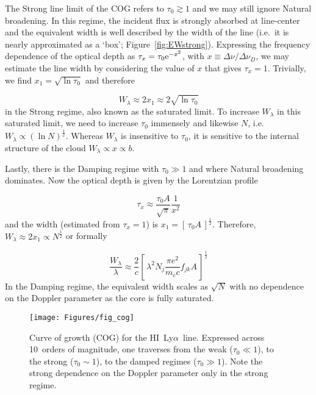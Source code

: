 \documentclass[graybox]{svmult}
\newcommand{\HI}{H{\sc I}}
\def\lya{Ly$\alpha$}
\def\ohf{\frac{1}{2}}
\def\ltk{\left [ \,}
\def\rtk{\, \right  ] }
\def\rme{{\rm e}}
\begin{document}
The Strong line limit of the COG refers to $\tau_0 \gtrsim 1$
and we may still ignore Natural broadening.
In this regime, the incident flux is strongly absorbed at line-center
and the equivalent width is well described by the width
of the line (i.e.\ it is nearly approximated as a `box';
Figure~\ref{fig:EWstrong}).
Expressing the frequency dependence of the optical
depth as $\tau_x = \tau_0 \rme^{-x^2}$, with
$x \equiv \Delta \nu / \Delta \nu_D$, we may estimate the 
line width by 
considering the value of $x$ that gives $\tau_x = 1$.
Trivially, we find $x_1 = \sqrt{\ln \tau_0}$ and therefore

\begin{equation}
W_\lambda \approx 2 x_1 \approx 2 \sqrt{\ln \tau_0}
\label{eqn:EWstrong}
\end{equation}
in the Strong regime, also known as the saturated limit.
To increase $W_\lambda$ in this saturated
limit, we need to increase $\tau_0$ immensely
and likewise $N$, i.e.\ $W_\lambda \propto (\ln N)^\ohf$.
Whereas $W_\lambda$ is insensitive to
$\tau_0$, it is sensitive to the internal structure of the cloud
$W_\lambda \propto x \propto b$.

Lastly, there is the Damping regime with $\tau_0 \gg 1$
and where Natural broadening dominates.
Now the optical depth is given by the Lorentzian profile

\begin{equation}
\tau_x \approx \frac{\tau_0 A}{\sqrt{\pi}} \frac{1}{x^2}
\end{equation}
and the width (estimated from $\tau_x = 1$) is
$x_1 = \ltk \tau_0 A \rtk^\ohf$.
Therefore, $W_\lambda \approx 2x_1 \propto N^\ohf$
or formally

\begin{equation}
\frac{W_\lambda}{\lambda} \approx \frac{2}{c} \ltk \lambda^2 N_j 
\frac{\pi e^2}{m_e c} f_{jk} A \rtk^\ohf
\end{equation}
In the Damping regime, the equivalent width scales
as $\sqrt{N}$ with no dependence on the Doppler parameter
as the core is fully saturated.

%
\begin{figure}[b]
\sidecaption
\texttt{[image: Figures/fig\_cog]}
%
%
\caption{Curve of growth (COG) for the \HI\ \lya\ line.
Expressed across 10~orders of magnitude, one traverses
from the weak ($\tau_0 \ll 1$), to the strong ($\tau_0 \sim 1$),
to the damped regimes ($\tau_0 \gg 1$).
Note the strong dependence on the Doppler parameter
only in the strong regime.
}
\label{fig:COG}       %
\end{figure}
\end{document}
